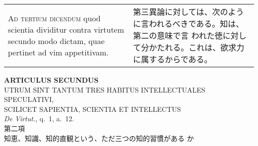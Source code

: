 \documentclass[10pt]{jsarticle}
\begin{document}
\begin{longtable}{p{21em}p{21em}}
\\

{\scshape Ad tertium dicendum} quod scientia dividitur contra virtutem
secundo modo dictam, quae pertinet ad vim appetitivam.

&

第三異論に対しては、次のように言われるべきである。知は、第二の意味で言
われた徳に対して分かたれる。これは、欲求力に属するからである。

\end{longtable}
\newpage

\begin{center}
 {\Large {\bf ARTICULUS SECUNDUS}}\\ {\large UTRUM SINT TANTUM TRES
 HABITUS INTELLECTUALES SPECULATIVI,\\SCILICET SAPIENTIA, SCIENTIA ET
 INTELLECTUS}\\ {\footnotesize {\itshape De Virtut.}, q.~1, a.~12.}\\
 {\Large 第二項\\知恵、知識、知的直観という、ただ三つの知的習慣がある
 か}
\end{center}
\end{document}
